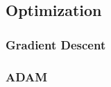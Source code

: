 \subsection{Optimization}\label{subsec:Opti}
\subsubsection*{Gradient Descent}
\subsubsection*{ADAM}